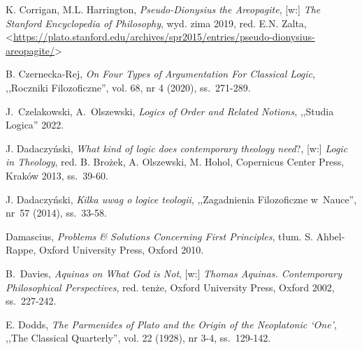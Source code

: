 \begin{thebibliography}{100}
K. Corrigan, M.L. Harrington, \textit{Pseudo-Dionysius the Areopagite}, [w:] \textit{The Stanford Encyclopedia of Philosophy},
wyd. zima 2019, red. E.N. Zalta, {\textless}\url{https://plato.stanford.edu/archives/spr2015/entries/pseudo-dionysius-areopagite/}{\textgreater}

B. Czernecka-Rej, \textit{On Four Types of Argumentation For Classical Logic}, ,,Roczniki Filozoficzne'', vol. 68, nr 4 (2020), ss.~271-289.

J.~Czelakowski, A.~Olszewski, \textit{Logics of Order and Related Notions}, ,,Studia Logica'' 2022.

J. Dadaczyński, \textit{What kind of logic does contemporary theology need}?, [w:] \textit{Logic in Theology}, red. B. Brożek, A. Olszewski, M. Hohol, Copernicus Center Press, Kraków 2013, ss.~39-60.

J. Dadaczyński, \textit{Kilka uwag o logice teologii}, ,,Zagadnienia Filozoficzne w~Nauce'', nr~57 (2014), ss.~33-58.

Damascius, \textit{Problems \& Solutions Concerning First Principles}, tłum. S. Ahbel-Rappe, Oxford University Press, Oxford 2010.

B.~Davies, \textit{Aquinas on What God is Not}, [w:]  \textit{Thomas Aquinas. Contemporary Philosophical Perspectives}, red. tenże, Oxford University Press, Oxford 2002, ss.~227-242.


E. Dodds, \textit{The Parmenides of Plato and the Origin of the Neoplatonic ‘One'}, ,,The Classical Quarterly'', vol. 22 (1928), nr 3-4, ss.~129-142.




\end{thebibliography}

